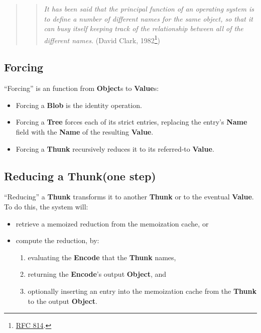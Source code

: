 \documentclass{article}
\newcommand{\blob}{\textbf{Blob}\xspace}
\newcommand{\valuex}{\textbf{Value}\xspace}
\newcommand{\valuexs}{\textbf{Value}s\xspace}
\newcommand{\object}{\textbf{Object}\xspace}
\newcommand{\objects}{\textbf{Object}s\xspace}
\newcommand{\encode}{\textbf{Encode}\xspace}
\newcommand{\thunk}{\textbf{Thunk}\xspace}
\newcommand{\name}{\textbf{Name}\xspace}
\newcommand{\tree}{\textbf{Tree}\xspace}
\begin{document}
\begin{quote}
\begin{quote}
\textit{It has been said that the principal function of an operating system
is to define a number of different names for the same object, so that it
can  busy  itself  keeping  track of the relationship between all of the
different names.} (David Clark, 1982\footnote{\href{https://www.rfc-editor.org/rfc/rfc814.html}{RFC 814}.})
\end{quote}
\end{quote}

\subsection{Forcing}

``Forcing'' is an function from \objects to \valuexs:

\begin{itemize}[itemsep=0pt]
\item Forcing a \blob is the identity operation.

\item Forcing a \tree forces each of its strict entries, replacing the
  entry's \name field with the \name of the resulting \valuex.

\item Forcing a \thunk recursively reduces it to its referred-to \valuex.
\end{itemize}

\subsection{Reducing a \thunk (one step)}

``Reducing'' a \thunk transforms it to another \thunk or to the
eventual \valuex. To do this, the system will:
\begin{itemize}[itemsep=0pt]
\item retrieve a memoized reduction from the memoization cache, or
\item compute the reduction, by:
  \begin{enumerate}[topsep=0pt, itemsep=0pt]
  \item evaluating the \encode that the \thunk names,
  \item returning the \encode's output \object, and
  \item optionally inserting an entry into the memoization cache from the \thunk to the output \object.
  \end{enumerate}
\end{itemize}
\end{document}
